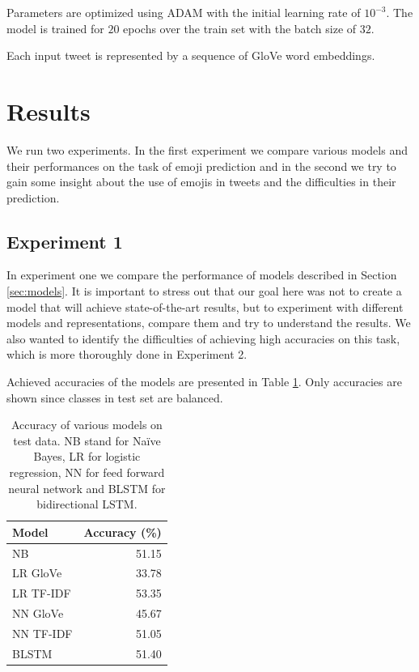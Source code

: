 \documentclass[10pt, a4paper]{article}
\begin{document}
Parameters are optimized using ADAM \citep{kingma2014adam} with the initial 
learning rate of $10^{-3}$. The model is trained for $20$ epochs over the train 
set with the batch size of $32$.

Each input tweet is represented by a sequence of GloVe word embeddings.

\section{Results}

We run two experiments. In the first experiment we compare various models and 
their performances on the task of emoji prediction and in the second we try to 
gain some insight about the use of emojis in tweets and the difficulties in 
their prediction.

\subsection{Experiment 1}

In experiment one we compare the performance of models described in Section 
\ref{sec:models}. It is important to stress out that our goal here was not to 
create a model that will achieve state-of-the-art results, but to experiment 
with different models and representations, compare them and try to understand 
the results. We also wanted to identify the difficulties of achieving high 
accuracies on this task, which is more thoroughly done in Experiment 2.

Achieved accuracies of the models are presented in Table 
\ref{tab:accuracy}. Only accuracies are shown since classes in test set are 
balanced.

\begin{table}
\caption{Accuracy of various models on test data. NB stand for Na\"ive Bayes, LR
for logistic regression, NN for feed forward neural network and BLSTM for 
bidirectional LSTM.}
\label{tab:accuracy}
\begin{center}
\begin{tabular}{lr}
\toprule
Model & Accuracy (\%) \\
\midrule
NB        & 51.15 \\
LR GloVe  & 33.78 \\
LR TF-IDF & 53.35 \\
NN GloVe  & 45.67 \\
NN TF-IDF & 51.05 \\
BLSTM     & 51.40 \\
\bottomrule
\end{tabular}
\end{center}
\end{table}
\end{document}
